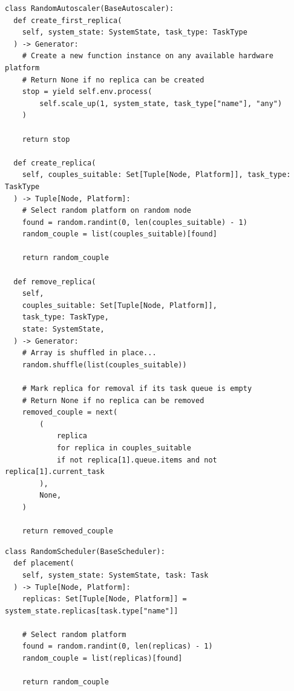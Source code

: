 \begin{longlisting}
    \label{code:herosim-random-autoscaler}
    \begin{verbatim}
class RandomAutoscaler(BaseAutoscaler):
  def create_first_replica(
    self, system_state: SystemState, task_type: TaskType
  ) -> Generator:
    # Create a new function instance on any available hardware platform
    # Return None if no replica can be created
    stop = yield self.env.process(
        self.scale_up(1, system_state, task_type["name"], "any")
    )

    return stop

  def create_replica(
    self, couples_suitable: Set[Tuple[Node, Platform]], task_type: TaskType
  ) -> Tuple[Node, Platform]:
    # Select random platform on random node
    found = random.randint(0, len(couples_suitable) - 1)
    random_couple = list(couples_suitable)[found]

    return random_couple

  def remove_replica(
    self,
    couples_suitable: Set[Tuple[Node, Platform]],
    task_type: TaskType,
    state: SystemState,
  ) -> Generator:
    # Array is shuffled in place...
    random.shuffle(list(couples_suitable))

    # Mark replica for removal if its task queue is empty
    # Return None if no replica can be removed
    removed_couple = next(
        (
            replica
            for replica in couples_suitable
            if not replica[1].queue.items and not replica[1].current_task
        ),
        None,
    )

    return removed_couple
    \end{verbatim}
\end{longlisting}

\begin{longlisting}
    \label{code:herosim-random-scheduler}
    \begin{verbatim}
class RandomScheduler(BaseScheduler):
  def placement(
    self, system_state: SystemState, task: Task
  ) -> Tuple[Node, Platform]:
    replicas: Set[Tuple[Node, Platform]] = system_state.replicas[task.type["name"]]

    # Select random platform
    found = random.randint(0, len(replicas) - 1)
    random_couple = list(replicas)[found]

    return random_couple
    \end{verbatim}
\end{longlisting}


